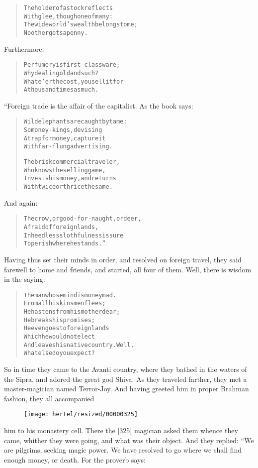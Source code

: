 \documentclass[article, twoside, 10pt]{memoir}
\renewenvironment{verbatim}{%
\begin{quote}%
\vskip -10pt%
\begin{alltt}\normalfont\small}{\end{alltt}%
\end{quote}%
\vskip -10pt
} %
\begin{document}
\begin{verbatim}
The holder of a stock reflects
    With glee, though one of many:
The wide world's wealth belongs to me;
    No other gets a penny.
\end{verbatim}
Furthermore:

\begin{verbatim}
Perfumery is first-class ware;
    Why deal in gold and such?
Whate'er the cost, you sell it for
    A thousand times as much.
\end{verbatim}
“Foreign trade is the affair of the capitalist. As the book says:

\begin{verbatim}
Wild elephants are caught by tame:
    So money-kings, devising
A trap for money, capture it
    With far-flung advertising.

The brisk commercial traveler,
    Who knows the selling game,
Invests his money, and returns
    With twice or thrice the same.
\end{verbatim}
And again:

\begin{verbatim}
The crow, or good-for-naught, or deer,
    Afraid of foreign lands,
In heedless slothfulness is sure
    To perish where he stands.”
\end{verbatim}
Having thus set their minds in order, and resolved on foreign
travel, they said farewell to home and friends, and started, all
four of them. Well, there is wisdom in the saying:

\begin{verbatim}
The man whose mind is money mad.
    From all his kinsmen flees;
He hastens from his mother dear;
    He breaks his promises;
He even goes to foreign lands
    Which he would not elect
And leaves his native country. Well,
    What else do you expect?
\end{verbatim}
So in time they came to the Avanti country, where they bathed in
the waters of the Sipra, and adored the great god Shiva. As they
traveled farther, they met a master-magician named Terror-Joy. And
having greeted him in proper Brahman fashion, they all accompanied
\begin{figure}[p]\texttt{[image: hertel/resized/00000325]}\end{figure}him to his monastery cell. There the [325] magician asked them
whence they came, whither they were going, and what was their
object. And they replied: “We are pilgrims, seeking magic power. We
have resolved to go where we shall find enough money, or death. For
the proverb says:
\end{document}
